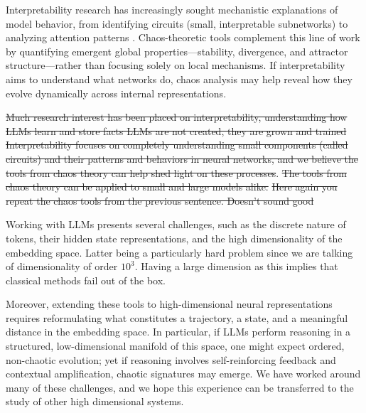 \documentclass[a4paper,12pt]{article}
\newcommand{\comm}[1]{\textcolor{myblue}{#1}}
\begin{document}


Interpretability research has increasingly sought mechanistic explanations of model behavior, from identifying circuits (small, interpretable subnetworks) to analyzing attention patterns \cite{olah2020zoom, ameisen2025circuit, lindsey2025biology}. Chaos-theoretic tools complement this line of work by quantifying emergent global properties—stability, divergence, and attractor structure—rather than focusing solely on local mechanisms. If interpretability aims to understand what networks do, chaos analysis may help reveal how they evolve dynamically across internal representations\cite{olah2020zoom, ameisen2025circuit, lindsey2025biology}.

\st{Much research interest has been placed on interpretability, understanding how LLMs learn and store facts
LLMs are not created, they are grown and trained
Interpretability focuses on completely understanding small components (called circuits) and their patterns and behaviors in neural networks, and we believe the tools from chaos theory can help shed light on these processes}\cite{olah2020zoom, ameisen2025circuit, lindsey2025biology}.  \st{The tools from chaos theory can be applied to small and large models alike.} \comm{\st{Here again you repeat the chaos tools from the previous sentence. Doesn't sound good}} %

Working with LLMs presents several challenges, such as the discrete nature of tokens, their hidden state representations, and the high dimensionality of the embedding space. Latter being a particularly hard problem since we are talking of dimensionality of order $10^3$. Having a large dimension as this implies that classical methods fail out of the box.

Moreover, extending these tools to high-dimensional neural representations requires reformulating what constitutes a trajectory, a state, and a meaningful distance in the embedding space. In particular, if LLMs perform reasoning in a structured, low-dimensional manifold of this space, one might expect ordered, non-chaotic evolution; yet if reasoning involves self-reinforcing feedback and contextual amplification, chaotic signatures may emerge. We have worked around many of these challenges, and we hope this experience can be transferred to the study of other high dimensional systems.
\end{document}
